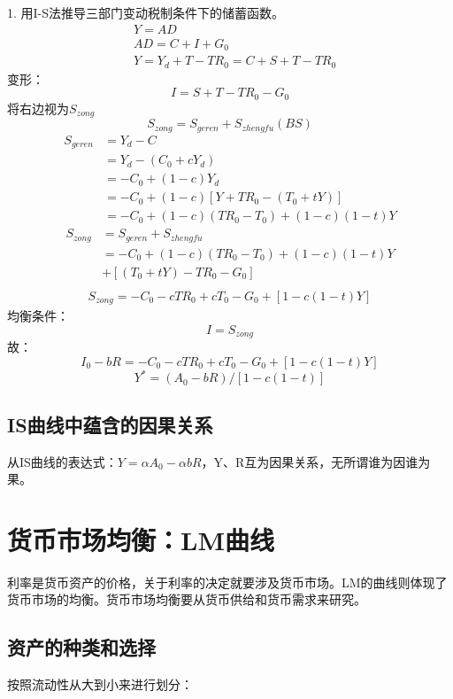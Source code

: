 \documentclass{article}
\begin{document}
1. 用I-S法推导三部门变动税制条件下的储蓄函数。
\begin{equation*}
	\begin{split}
	&Y=AD\\
	&AD=C+I+G_0\\
	&Y=Y_d+T-TR_0=C+S+T-TR_0
	\end{split}
\end{equation*}
变形：
\[
I=S+T-TR_0-G_0
\]
将右边视为$ S_{zong} $
\[
S_{zong}=S_{geren}+S_{zhengfu}(BS)
\]
\begin{equation*}
	\begin{split}
	S_{geren}&=Y_d-C\\
	&=Y_d-(C_0+cY_d)\\
	&=-C_0+(1-c)Y_d\\
	&=-C_0+(1-c)[Y+TR_0-(T_0+tY)]\\
	&=-C_0+(1-c)(TR_0-T_0)+(1-c)(1-t)Y
	\end{split}
\end{equation*}
\begin{equation*}
	\begin{split}
	S_{zong}&=S_{geren}+S_{zhengfu}\\
	&=-C_0+(1-c)(TR_0-T_0)+(1-c)(1-t)Y\\
	&+[(T_0+tY)-TR_0-G_0]\\
	\end{split}
\end{equation*}
\begin{equation*}
	\begin{split}
	S_{zong}=-C_0-cTR_0+cT_0-G_0+[1-c(1-t)Y]
	\end{split}
\end{equation*}
均衡条件：
\[
I=S_{zong}
\]
故：
\[
I_0-bR=-C_0-cTR_0+cT_0-G_0+[1-c(1-t)Y]
\]
\[
Y^*=(A_0-bR)/[1-c(1-t)]
\]

\subsection{IS曲线中蕴含的因果关系}
从IS曲线的表达式：$ Y=\alpha A_0-\alpha bR $，Y、R互为因果关系，无所谓谁为因谁为果。

\section{货币市场均衡：LM曲线}
利率是货币资产的价格，关于利率的决定就要涉及货币市场。LM的曲线则体现了货币市场的均衡。货币市场均衡要从货币供给和货币需求来研究。
\subsection{资产的种类和选择}
按照流动性从大到小来进行划分：
\end{document}
